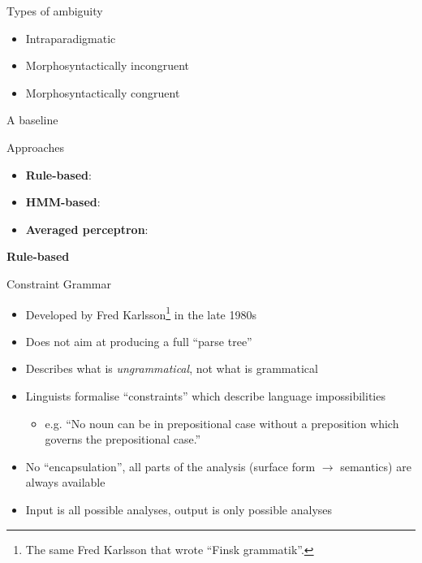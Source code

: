 \documentclass{beamer}
\begin{document}
\begin{frame}{Types of ambiguity}

\begin{itemize}
  \item Intraparadigmatic
  \item Morphosyntactically incongruent
  \item Morphosyntactically congruent
\end{itemize}

\end{frame}

\begin{frame}{A baseline}

\end{frame}




\begin{frame}{Approaches}

\begin{itemize}
   \item \textbf{Rule-based}:
   \item \textbf{HMM-based}:
   \item \textbf{Averaged perceptron}:
\end{itemize}

\end{frame}

\begin{frame}
\centering
{\LARGE {\bf Rule-based } }
\end{frame}

\begin{frame}{Constraint Grammar}

    \begin{itemize}
      \item Developed by Fred Karlsson\footnote{The same Fred Karlsson that wrote ``Finsk grammatik''.} in the late 1980s
      \item Does not aim at producing a full ``parse tree''
      \item Describes what is \emph{ungrammatical}, not what is grammatical
      \item Linguists formalise ``constraints'' which describe language impossibilities
      \begin{itemize}
        \item e.g. ``No noun can be in prepositional case without a preposition which 
          governs the prepositional case.''
      \end{itemize}
      \item No ``encapsulation'', all parts of the analysis (surface form $\rightarrow$ semantics) are always available
      \item Input is all possible analyses, output is only possible analyses
    \end{itemize}

\end{frame}
\end{document}
